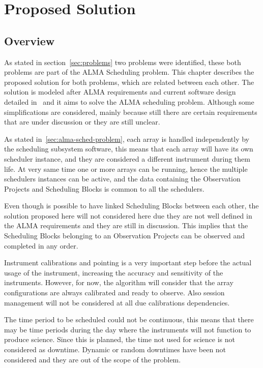 \part{Proposed Solution}

\chapter{Overview}

As stated in section~\ref{sec:problems} two problems were identified, these both problems are part of the ALMA Scheduling problem.
This chapter describes the proposed solution for both problems, which are related between each other.
The solution is modeled after ALMA requirements and current software design detailed in~\cite{avarias11,clarke12,schwarz04,apdm-model} and it aims to solve the ALMA scheduling problem. Although some simplifications are considered, mainly because still there are certain requirements that are under discussion or they are still unclear. 

As stated in~\ref{sec:alma-sched-problem}, each array is handled independently by the scheduling subsystem software, this means that each array will have its own scheduler instance, and they are considered a different instrument during them life. At very same time one or more arrays can be running, hence the multiple schedulers instances can be active, and the data containing the Observation Projects and Scheduling Blocks is common to all the schedulers.

Even though is possible to have linked Scheduling Blocks between each other, the solution proposed here will not considered here due they are not well defined in the ALMA requirements and they are still in discussion. This implies that the Scheduling Blocks belonging to an Observation Projects can be observed and completed in any order.

Instrument calibrations and pointing is a very important step before the actual usage of the instrument, increasing the accuracy and sensitivity of the instruments. However, for now, the algorithm will consider that the array configurations are always calibrated and ready to observe. Also session management will not be considered at all due calibrations dependencies.

The time period to be scheduled could not be continuous, this means that there may be time periods during the day where the instruments will not function to produce science. Since this is planned, the time not used for science is not considered as downtime. Dynamic or random downtimes have been not considered and they are out of the scope of the problem.

